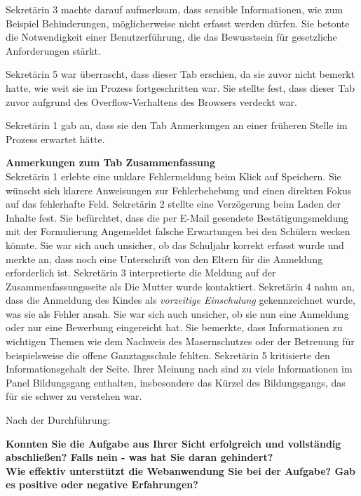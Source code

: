 Sekretärin 3 machte darauf aufmerksam, dass sensible Informationen, wie zum Beispiel Behinderungen, möglicherweise nicht erfasst werden dürfen. Sie betonte die Notwendigkeit einer Benutzerführung, die das Bewusstsein für gesetzliche Anforderungen stärkt.

Sekretärin 5 war überrascht, dass dieser Tab erschien, da sie zuvor nicht bemerkt hatte, wie weit sie im Prozess fortgeschritten war. Sie stellte fest, dass dieser Tab zuvor aufgrund des Overflow-Verhaltens des Browsers verdeckt war.

Sekretärin 1 gab an, dass sie den Tab \glqq Anmerkungen\grqq{} an einer früheren Stelle im Prozess erwartet hätte.

\textbf{Anmerkungen zum Tab \glqq Zusammenfassung\grqq{}}\\
Sekretärin 1 erlebte eine unklare Fehlermeldung beim Klick auf \glqq Speichern\grqq{}. Sie wünscht sich klarere Anweisungen zur Fehlerbehebung und einen direkten Fokus auf das fehlerhafte Feld.
Sekretärin 2 stellte eine Verzögerung beim Laden der Inhalte fest. Sie befürchtet, dass die per E-Mail gesendete Bestätigungsmeldung mit der Formulierung \glqq Angemeldet\grqq{} falsche Erwartungen bei den Schülern wecken könnte. Sie war sich auch unsicher, ob das Schuljahr korrekt erfasst wurde und merkte an, dass noch eine Unterschrift von den Eltern für die Anmeldung erforderlich ist.
Sekretärin 3 interpretierte die Meldung auf der Zusammenfassungsseite als \glqq Die Mutter wurde kontaktiert\grqq{}.
Sekretärin 4 nahm an, dass die Anmeldung des Kindes als \textit{vorzeitige Einschulung} gekennzeichnet wurde, was sie als Fehler ansah. Sie war sich auch unsicher, ob sie nun eine \glqq Anmeldung\grqq{} oder nur eine \glqq Bewerbung\grqq{} eingereicht hat. Sie bemerkte, dass Informationen zu wichtigen Themen wie dem Nachweis des Masernschutzes oder der Betreuung für beispielsweise die offene Ganztagsschule fehlten.
Sekretärin 5 kritisierte den Informationsgehalt der Seite. Ihrer Meinung nach sind zu viele Informationen im Panel \glqq Bildungsgang\grqq{} enthalten, insbesondere das Kürzel des Bildungsgangs, das für sie schwer zu verstehen war.



Nach der Durchführung:

\textbf{Konnten Sie die Aufgabe aus Ihrer Sicht erfolgreich und vollständig abschließen? Falls nein - was hat Sie daran gehindert?}\\

\textbf{Wie effektiv unterstützt die Webanwendung Sie bei der Aufgabe?  Gab es positive oder negative Erfahrungen?}\\

